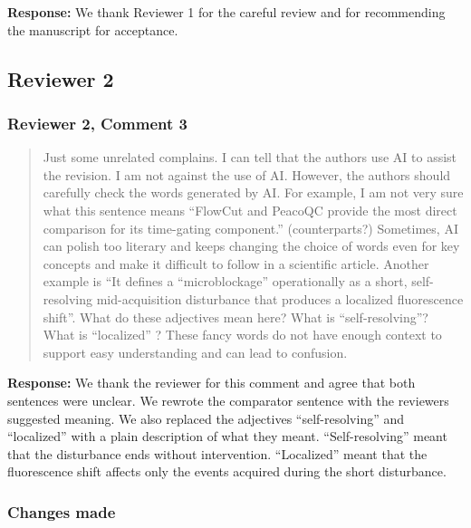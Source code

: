 \documentclass[
  11pt,
  a4paper,
]{article}
\begin{document}
\textbf{Response:} We thank Reviewer 1 for the careful review and for
recommending the manuscript for acceptance.

\subsection{Reviewer 2}\label{reviewer-2}

\subsubsection{Reviewer 2, Comment 3}\label{reviewer-2-comment-3}

\begin{quote}
Just some unrelated complains. I can tell that the authors use AI to
assist the revision. I am not against the use of AI. However, the
authors should carefully check the words generated by AI. For example, I
am not very sure what this sentence means ``FlowCut and PeacoQC provide
the most direct comparison for its time-gating component.''
(counterparts?) Sometimes, AI can polish too literary and keeps changing
the choice of words even for key concepts and make it difficult to
follow in a scientific article. Another example is ``It defines a
``microblockage'' operationally as a short, self-resolving
mid-acquisition disturbance that produces a localized fluorescence
shift''. What do these adjectives mean here? What is ``self-resolving''?
What is ``localized'' ? These fancy words do not have enough context to
support easy understanding and can lead to confusion.
\end{quote}

\textbf{Response:} We thank the reviewer for this comment and agree that
both sentences were unclear. We rewrote the comparator sentence with the
reviewer\textquotesingle s suggested meaning. We also replaced the
adjectives ``self-resolving'' and ``localized'' with a plain description
of what they meant. ``Self-resolving'' meant that the disturbance ends
without intervention. ``Localized'' meant that the fluorescence shift
affects only the events acquired during the short disturbance.

\subsubsection{Changes made}\label{changes-made}
\end{document}
